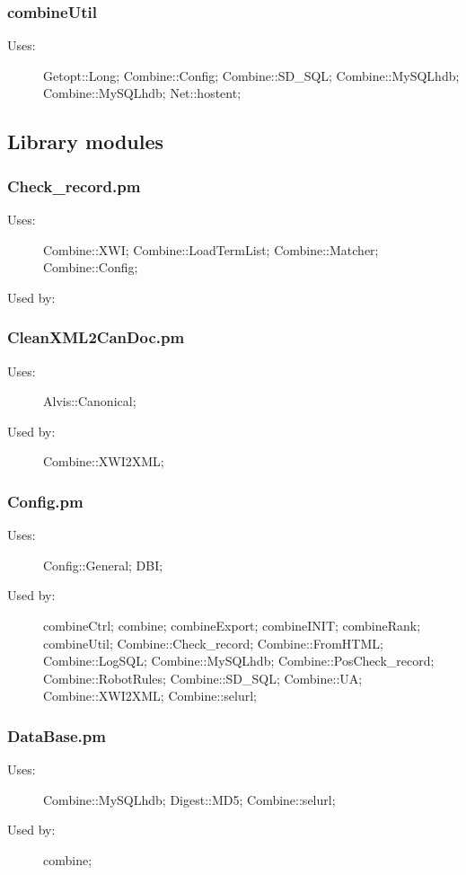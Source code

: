 \subsubsection{combineUtil}
\begin{description}
\item[Uses:] Getopt::Long; Combine::Config; Combine::SD\_SQL; Combine::MySQLhdb; Combine::MySQLhdb; Net::hostent; 

\end{description}
\subsection{Library modules}
\subsubsection{Check\_record.pm}
\begin{description}
\item[Uses:] Combine::XWI; Combine::LoadTermList; Combine::Matcher; Combine::Config; 

\item[Used by:] 

\end{description}
\subsubsection{CleanXML2CanDoc.pm}
\begin{description}
\item[Uses:] Alvis::Canonical; 

\item[Used by:] Combine::XWI2XML; 

\end{description}
\subsubsection{Config.pm}
\begin{description}
\item[Uses:] Config::General; DBI; 

\item[Used by:] combineCtrl; combine; combineExport; combineINIT; combineRank; combineUtil; Combine::Check\_record; Combine::FromHTML; Combine::LogSQL; Combine::MySQLhdb; Combine::PosCheck\_record; Combine::RobotRules; Combine::SD\_SQL; Combine::UA; Combine::XWI2XML; Combine::selurl; 

\end{description}
\subsubsection{DataBase.pm}
\begin{description}
\item[Uses:] Combine::MySQLhdb; Digest::MD5; Combine::selurl; 

\item[Used by:] combine; 

\end{description}

